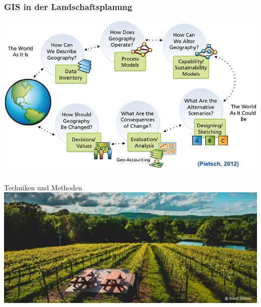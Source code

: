\documentclass{beamer}
\begin{document}
\begin{frame}
\frametitle{GIS in der Landschaftsplanung}
\centering
\includegraphics[width=1.07\textwidth]{Figures/gis_app.png}
\end{frame}


\begin{frame}
\frametitle{}
\centering
\Huge \alert{Techniken und Methoden}\\[0.5cm]
\includegraphics[width=\textwidth]{Figures/wine.png}
\end{frame}

\end{document}
